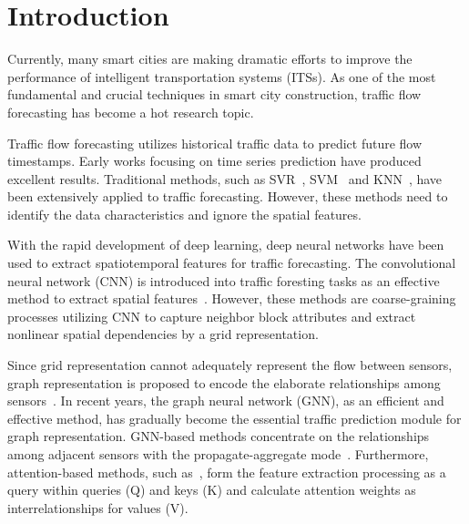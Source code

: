 \documentclass[sn-mathphys,iicol]{sn-jnl}
\theoremstyle{thmstyleone}\newtheorem{theorem}{Theorem}\newtheorem{proposition}[theorem]{Proposition}
\theoremstyle{thmstyletwo}\newtheorem{example}{Example}\newtheorem{remark}{Remark}
\theoremstyle{thmstylethree}\newtheorem{definition}{Definition}
\begin{document}





\maketitle


\section{Introduction}
Currently, many smart cities are making dramatic efforts to improve the performance of intelligent transportation systems (ITSs). As one of the most fundamental and crucial techniques in smart city construction, traffic flow forecasting has become a hot research topic.





Traffic flow forecasting utilizes historical traffic data to predict future flow timestamps. Early works focusing on time series prediction have produced excellent results. Traditional methods, such as SVR~\cite{Drucker:1997}, SVM~\cite{Jeong:ww,Sun:2015wj} and KNN~\cite{van2012short,Luo:2019hm}, have been extensively applied to traffic forecasting. However, these methods need to identify the data characteristics and ignore the spatial features.

With the rapid development of deep learning, deep neural networks have been used to extract spatiotemporal features for traffic forecasting. The convolutional neural network (CNN) is introduced into traffic foresting tasks as an effective method to extract spatial features~\cite{Cui:2018deep,Yao:2018wy,Zhang:2018uj,Wang.20206tj}. However, these methods are coarse-graining processes utilizing CNN to capture neighbor block attributes and extract nonlinear spatial dependencies by a grid representation. 

Since grid representation cannot adequately represent the flow between sensors, graph representation is proposed to encode the elaborate relationships among sensors~\cite{yu2018spatio,li2018diffusion}. In recent years, the graph neural network (GNN), as an efficient and effective method, has gradually become the essential traffic prediction module for graph representation. GNN-based methods concentrate on the relationships among adjacent sensors with the propagate-aggregate mode~\cite{yu2018spatio,li2018diffusion,Guo.2019,Song.2020,Li_Zhu_2021,Guo.2021}. Furthermore, attention-based methods, such as~\cite{Guo.2019,Song.2020,Li_Zhu_2021,Guo.2021,Liu.2021,Wang.2021,Zhou.2021}, form the feature extraction processing as a query within queries (Q) and keys (K) and calculate attention weights as interrelationships for values (V).
\end{document}
